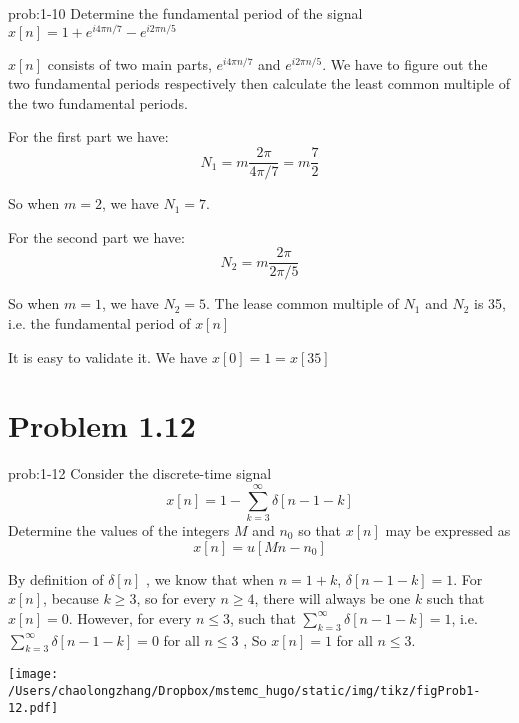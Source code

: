 \documentclass[koma,a4paper,utopia,12pt,listings-color,microtype,paralist,colorlinks,urlcolor=red]{org-article}
\begin{document}
\begin{prob}[]{prob:1-10}
Determine the fundamental period of the signal \(x[n] = 1 + e^{i4\pi n/7} -
e^{i2\pi n/5}\)
\label{prob:1-10}
\end{prob}

\(x[n]\) consists of two main parts, \(e^{i4\pi n/7}\) and \(e^{i2\pi n/5}\).
We have to figure out the two fundamental periods respectively then calculate
the least common multiple of the two fundamental periods.

For the first part we have:
\begin{equation*}
N_{1} = m \frac{2\pi}{ 4\pi /7 } = m\frac{7}{2}
\end{equation*}

So when \(m=2\), we have \(N_{1} = 7\).

For the second part we have:
\begin{equation*}
N_{2} = m \frac{2\pi}{ 2\pi /5 }
\end{equation*}

So when \(m=1\), we have \(N_{2} = 5\). The lease common multiple of \(N_{1}\)
and \(N_{2}\) is 35, i.e. the fundamental period of \(x[n]\)

It is easy to validate it. We have \(x[0] = 1 = x[35]\)
\section{Problem 1.12}
\label{sec:orgbd55a30}


\begin{prob}[]{prob:1-12}
Consider the discrete-time signal
\begin{equation*}
x[n] = 1- \sum_{k=3}^{\infty}\delta[n-1-k]
\end{equation*}
Determine the values of the integers \(M\) and \(n_{0}\) so that \(x[n]\)
may be expressed as
\begin{equation*}
x[n] = u[Mn - n_{0}]
\end{equation*}
\label{prob:1-12}
\end{prob}

By definition of \(\delta[n]\) , we know that when \(n=1+k\), \(\delta[n-1-k] =
1\). For \(x[n]\), because \(k\geq 3\), so for every \(n\geq 4\), there will
always be one \(k\) such that \(x[n] = 0\). However, for every \(n\leq 3\),
such that \(\sum_{k=3}^{\infty} \delta[n-1-k] = 1\), i.e. \(\sum_{k=3}^{\infty}
\delta[n-1-k] = 0\) for all \(n\leq 3\) , So \(x[n] = 1\) for all \(n\leq 3\).

\begin{center}
\texttt{[image: /Users/chaolongzhang/Dropbox/mstemc\_hugo/static/img/tikz/figProb1-12.pdf]}
\end{center}
\end{document}
